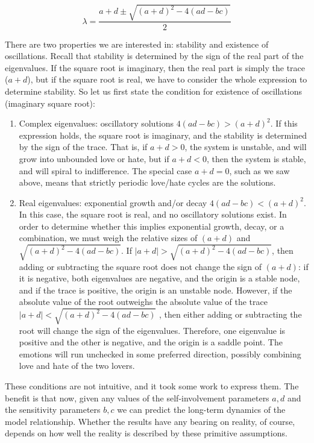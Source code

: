 \documentclass[
  letterpaper,
  DIV=11,
  numbers=noendperiod]{scrreprt}
\begin{document}
\[
\lambda =  \frac{a+d \pm \sqrt{(a+d)^2-4(ad-bc)}}{2}
\]

There are two properties we are interested in: stability and existence
of oscillations. Recall that stability is determined by the sign of the
real part of the eigenvalues. If the square root is imaginary, then the
real part is simply the trace (\(a+d\)), but if the square root is real,
we have to consider the whole expression to determine stability. So let
us first state the condition for existence of oscillations (imaginary
square root):

\begin{enumerate}
\def\labelenumi{\arabic{enumi}.}
\item
  Complex eigenvalues: oscillatory solutions \(4(ad-bc) > (a+d)^2\). If
  this expression holds, the square root is imaginary, and the stability
  is determined by the sign of the trace. That is, if \(a+d > 0\), the
  system is unstable, and will grow into unbounded love or hate, but if
  \(a+d < 0\), then the system is stable, and will spiral to
  indifference. The special case \(a+d = 0\), such as we saw above,
  means that strictly periodic love/hate cycles are the solutions.
\item
  Real eigenvalues: exponential growth and/or decay
  \(4(ad-bc) < (a+d)^2\). In this case, the square root is real, and no
  oscillatory solutions exist. In order to determine whether this
  implies exponential growth, decay, or a combination, we must weigh the
  relative sizes of \((a+d)\) and \(\sqrt{(a+d)^2-4(ad-bc)}\). If
  \(|a+d| > \sqrt{(a+d)^2-4(ad-bc)}\), then adding or subtracting the
  square root does not change the sign of \((a+d)\): if it is negative,
  both eigenvalues are negative, and the origin is a stable node, and if
  the trace is positive, the origin is an unstable node. However, if the
  absolute value of the root outweighs the absolute value of the trace
  \(|a+d| < \sqrt{(a+d)^2-4(ad-bc)}\) , then either adding or
  subtracting the root will change the sign of the eigenvalues.
  Therefore, one eigenvalue is positive and the other is negative, and
  the origin is a saddle point. The emotions will run unchecked in some
  preferred direction, possibly combining love and hate of the two
  lovers.
\end{enumerate}

These conditions are not intuitive, and it took some work to express
them. The benefit is that now, given any values of the self-involvement
parameters \(a,d\) and the sensitivity parameters \(b,c\) we can predict
the long-term dynamics of the model relationship. Whether the results
have any bearing on reality, of course, depends on how well the reality
is described by these primitive assumptions.
\end{document}
